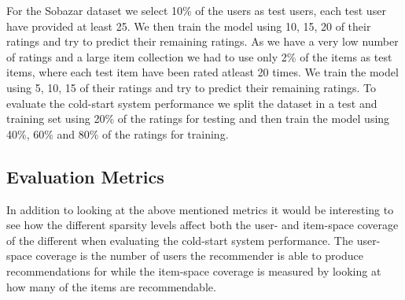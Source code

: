 For the Sobazar dataset we select 10\% of the users as test users, each test user have provided at least 25.
We then train the model using 10, 15, 20 of their ratings and try to predict their remaining ratings. As we have a very
low number of ratings and a large item collection we had to use only 2\% of the items as test items, where each
test item have been rated atleast 20 times. We train the model using 5, 10, 15 of their ratings and try to predict
their remaining ratings. To evaluate the cold-start system performance we split the dataset in a test and training
set using 20\% of the ratings for testing and then train the model using 40\%, 60\% and 80\% of the ratings for training.




\subsection{Evaluation Metrics}




In addition to looking at the above mentioned metrics it would be interesting to see how the different sparsity
levels affect both the user- and item-space coverage of the different when evaluating the cold-start system performance.
The user-space coverage is the number of users the recommender is able to produce recommendations for while the item-space
coverage is measured by looking at how many of the items are recommendable.



